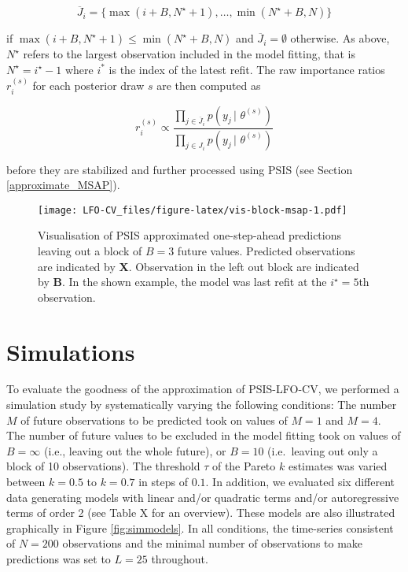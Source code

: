 \documentclass[american,]{article}
\begin{document}
\begin{equation}
\overline{J}_i = \{ \max(i + B, N^\star + 1), \ldots, \min(N^\star + B, N) \}
\end{equation}

if \(\max(i + B, N^\star + 1) \leq \min(N^\star + B, N)\) and
\(\overline{J}_i = \emptyset\) otherwise. As above, \(N^\star\) refers to the
largest observation included in the model fitting, that is
\(N^\star = i^\star - 1\) where \(i^*\) is the index of the latest refit. The raw
importance ratios \(r_i^{(s)}\) for each posterior draw \(s\) are then computed as

\begin{equation}
r_i^{(s)} \propto \frac{\prod_{j \in \overline{J}_i} p(y_j \,|\, \,\theta^{(s)})}
{\prod_{j \in J_i} p(y_j \,|\, \,\theta^{(s)})}
\end{equation}

before they are stabilized and further processed using PSIS (see Section
\ref{approximate_MSAP}).

\begin{figure}
\centering
\texttt{[image: LFO-CV\_files/figure-latex/vis-block-msap-1.pdf]}
\caption{\label{fig:vis-block-msap}Visualisation of PSIS approximated one-step-ahead predictions leaving out a block of \(B = 3\) future values. Predicted observations are indicated by \textbf{X}. Observation in the left out block are indicated by \textbf{B}. In the shown example, the model was last refit at the \(i^\star = 5\)th observation.}
\end{figure}

\hypertarget{simulations}{%
\section{Simulations}\label{simulations}}

To evaluate the goodness of the approximation of PSIS-LFO-CV,
we performed a simulation study by systematically varying the following
conditions: The number \(M\) of future observations to be predicted took on
values of \(M = 1\) and \(M = 4\). The number of future values to be excluded in the model
fitting took on values of \(B = \infty\) (i.e., leaving out the whole future), or
\(B = 10\) (i.e.~leaving out only a block of 10 observations).
The threshold \(\tau\) of the Pareto \(k\) estimates was varied between
\(k = 0.5\) to \(k = 0.7\) in steps of \(0.1\). In addition, we evaluated six
different data generating models with linear and/or quadratic terms and/or
autoregressive terms of order 2 (see Table X for an overview). These models are
also illustrated graphically in Figure \ref{fig:simmodels}. In all conditions,
the time-series consistent of \(N = 200\) observations and the minimal number
of observations to make predictions was set to \(L = 25\) throughout.
\end{document}
